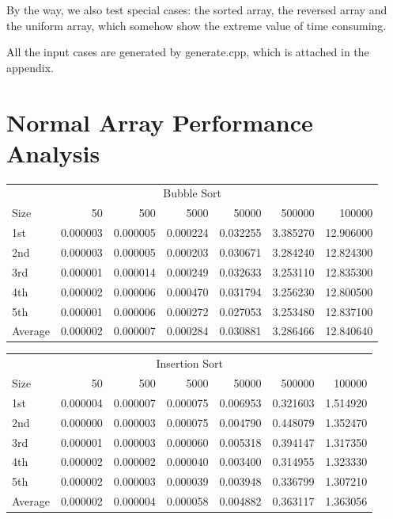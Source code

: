 \documentclass{article}
\begin{document}
By the way, we also test special cases: the sorted array, the reversed array and the uniform array, which somehow show the extreme value of time consuming. 

All the input cases are generated by generate.cpp, which is attached in the appendix.

\section{Normal Array Performance Analysis}
\begin{table}[htbp]
  \centering
    \begin{tabular}{lrrrrrr}
    \multicolumn{7}{c}{Bubble Sort} \\
    Size  & 50    & 500   & 5000  & 50000  & 500000  & 100000  \\\hline
    1st   & 0.000003  & 0.000005  & 0.000224  & 0.032255  & 3.385270  & 12.906000  \\
    2nd   & 0.000003  & 0.000005  & 0.000203  & 0.030671  & 3.284240  & 12.824300  \\
    3rd   & 0.000001  & 0.000014  & 0.000249  & 0.032633  & 3.253110  & 12.835300  \\
    4th   & 0.000002  & 0.000006  & 0.000470  & 0.031794  & 3.256230  & 12.800500  \\
    5th   & 0.000001  & 0.000006  & 0.000272  & 0.027053  & 3.253480  & 12.837100  \\
    Average & 0.000002  & 0.000007  & 0.000284  & 0.030881  & 3.286466  & 12.840640  \\
    \end{tabular}%
  \label{tab:addlabel}%
\end{table}%

\begin{table}[htbp]
  \centering
    \begin{tabular}{lrrrrrr}
    \multicolumn{7}{c}{Insertion Sort} \\
    Size  & 50    & 500   & 5000  & 50000  & 500000  & 100000  \\\hline
    1st   & 0.000004  & 0.000007  & 0.000075  & 0.006953  & 0.321603  & 1.514920  \\
    2nd   & 0.000000  & 0.000003  & 0.000075  & 0.004790  & 0.448079  & 1.352470  \\
    3rd   & 0.000001  & 0.000003  & 0.000060  & 0.005318  & 0.394147  & 1.317350  \\
    4th   & 0.000002  & 0.000002  & 0.000040  & 0.003400  & 0.314955  & 1.323330  \\
    5th   & 0.000002  & 0.000003  & 0.000039  & 0.003948  & 0.336799  & 1.307210  \\
    Average & 0.000002  & 0.000004  & 0.000058  & 0.004882  & 0.363117  & 1.363056  \\
    \end{tabular}%
  \label{tab:addlabel}%
\end{table}%
\end{document}
